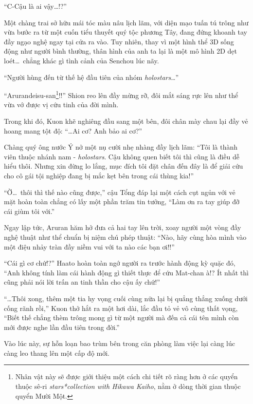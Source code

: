 \documentclass[../main.tex]{subfiles}
\begin{document}
``C-Cậu là ai vậy\dots!?''

Một chàng trai sở hữu mái tóc màu nâu lịch lãm, với diện mạo tuấn tú trông như vừa bước ra từ một cuốn tiểu thuyết quý tộc phương Tây, đang đứng khoanh tay đầy ngạo nghệ ngay tại cửa ra vào. Tuy nhiên, thay vì một hình thể 3D sống động như người bình thường, thân hình của anh ta lại là một mô hình 2D dẹt loét\dots\ chẳng khác gì tình cảnh của Senchou lúc nãy.

``Người hùng đến từ thế hệ đầu tiên của nhóm \textit{holostars}\dots''

``Arurandeisu-san\footnote{Nhân vật này sẽ được giới thiệu một cách chi tiết rõ ràng hơn ở các quyển thuộc sê-ri \textit{stars*collection with Hikawa Kaiho}, nằm ở dòng thời gian thuộc quyển Mười Một.}!!'' Shion reo lên đầy mừng rỡ, đôi mắt sáng rực lên như thể vừa vớ được vị cứu tinh của đời mình.


Trong khi đó, Kuon khẽ nghiêng đầu sang một bên, đôi chân mày chau lại đầy vẻ hoang mang tột độ: ``\dots Ai cơ? Anh bảo ai cơ?''

Chàng quý ông nước Ý nở một nụ cười nhẹ nhàng đầy lịch lãm: ``Tôi là thành viên thuộc nhánh nam - \textit{holostars}. Cậu không quen biết tôi thì cũng là điều dễ hiểu thôi. Nhưng xin đừng lo lắng, mục đích tôi đặt chân đến đây là để giải cứu cho cô gái tội nghiệp đang bị mắc kẹt bên trong cái thùng kia!''

``Ờ\dots\ thôi thì thế nào cũng được,'' cậu Tổng đáp lại một cách cụt ngủn với vẻ mặt hoàn toàn chẳng có lấy một phần trăm tin tưởng, ``Làm ơn ra tay giúp đỡ cái giùm tôi với.''

Ngay lập tức, Aruran hăm hở đưa cả hai tay lên trời, xoay người một vòng đầy nghệ thuật như thể chuẩn bị niệm chú phép thuật: ``Nào, hãy cùng hòa mình vào một điệu nhảy tràn đầy niềm vui với ta nào các bạn ơi!!''

``Cái gì cơ chứ!?'' Haato hoàn toàn ngớ người ra trước hành động kỳ quặc đó, ``Anh không tính làm cái hành động gì thiết thực để cứu Mat-chan à!? Ít nhất thì cũng phải nói lời trấn an tinh thần cho cậu ấy chứ!''

``\dots Thôi xong, thêm một tia hy vọng cuối cùng nữa lại bị quẳng thẳng xuống dưới cống rãnh rồi,'' Kuon thở hắt ra một hơi dài, lắc đầu tỏ vẻ vô cùng thất vọng, ``Biết thế chẳng thèm trông mong gì từ một người mà đến cả cái tên mình còn mới được nghe lần đầu tiên trong đời.''

Vào lúc này, sự hỗn loạn bao trùm bên trong căn phòng làm việc lại càng lúc càng leo thang lên một cấp độ mới.
\end{document}
